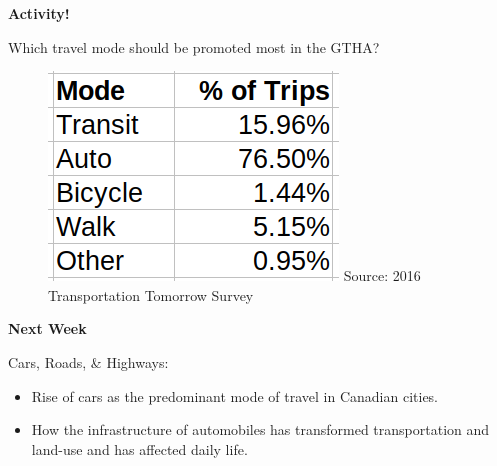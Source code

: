 \documentclass[aspectratio=169]{beamer}
\begin{document}
\begin{frame}
	
	\Large{\textbf{Activity!}}
	
	\vspace{4mm}
	
	\normalsize
	Which travel mode should be promoted most in the GTHA?
		
	\vspace{4mm}

	\begin{figure}
		\centering
		\includegraphics[width=0.3\linewidth]{images/mode_share_gtha_2016.png}
		\tiny{Source: 2016 Transportation Tomorrow Survey}
	\end{figure}

\end{frame}











% 




\begin{frame}
	\textbf{Next Week} 
	
	\vspace{4mm}
	
	Cars, Roads, \& Highways:
	
	\begin{itemize}
		
		
		\item Rise of cars as the predominant mode of travel in Canadian cities. 
		
		\item How the infrastructure of automobiles has transformed transportation and land-use and has affected daily life. 
	\end{itemize}

\end{frame}
\end{document}
